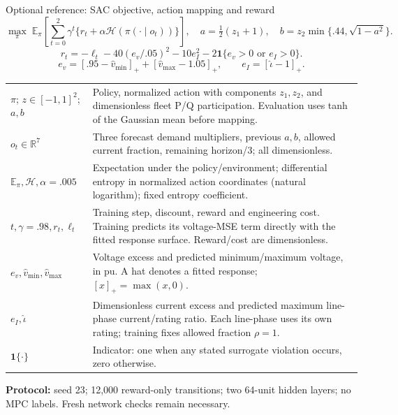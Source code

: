 \begin{frame}[t]{Optional reference: SAC objective, action mapping and reward}
\setlength{\parskip}{0pt}
\setlength{\abovedisplayskip}{0pt}\setlength{\belowdisplayskip}{1pt}\setlength{\abovedisplayshortskip}{0pt}\setlength{\belowdisplayshortskip}{1pt}
\[
\max_\pi\;\mathbb E_\pi\!\left[\sum_{t=0}^{2}\gamma^t\{r_t+\alpha\mathcal H(\pi(\cdot\mid o_t))\}\right],\quad
a=\tfrac12(z_1+1),\quad b=z_2\min\{.44,\sqrt{1-a^2}\}.
\]
\[
r_t=-\ell_t-40(e_v/.05)^2-10e_I^2-2\mathbf1\{e_v>0\text{ or }e_I>0\}.
\]
\[
e_v=[.95-\hat v_{\min}]_++[\hat v_{\max}-1.05]_+,\qquad e_I=[\hat\iota-1]_+.
\]
\begin{tabular}{@{}>{\raggedright\arraybackslash}p{.24\linewidth}>{\raggedright\arraybackslash}p{.69\linewidth}@{}}
$\pi$; $z\in[-1,1]^2$; $a,b$ & Policy, normalized action with components $z_1,z_2$, and dimensionless fleet P/Q participation. Evaluation uses tanh of the Gaussian mean before mapping. \\
$o_t\in\mathbb R^7$ & Three forecast demand multipliers, previous $a,b$, allowed current fraction, remaining horizon/3; all dimensionless. \\
$\mathbb E_\pi,\mathcal H,\alpha=.005$ & Expectation under the policy/environment; differential entropy in normalized action coordinates (natural logarithm); fixed entropy coefficient. \\
$t,\gamma=.98,r_t,\ell_t$ & Training step, discount, reward and engineering cost. Training predicts its voltage-MSE term directly with the fitted response surface. Reward/cost are dimensionless. \\
$e_v,\hat v_{\min},\hat v_{\max}$ & Voltage excess and predicted minimum/maximum voltage, in pu. A hat denotes a fitted response; $[x]_+=\max(x,0)$. \\
$e_I,\hat\iota$ & Dimensionless current excess and predicted maximum line-phase current/rating ratio. Each line-phase uses its own rating; training fixes allowed fraction $\rho=1$. \\
$\mathbf1\{\cdot\}$ & Indicator: one when any stated surrogate violation occurs, zero otherwise. \\
\end{tabular}
\par\textbf{Protocol:} seed 23; 12,000 reward-only transitions; two 64-unit hidden layers; no MPC labels. Fresh network checks remain necessary.

\end{frame}
